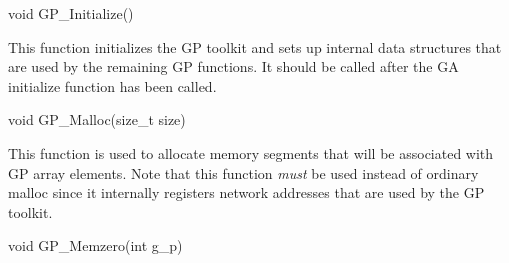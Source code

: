 \documentclass[12pt]{article}
\begin{document}


\begin{capi}
\begin{ccode}
void GP_Initialize()
\end{ccode}
\end{capi}

\wcoll

\begin{desc}

This function initializes the GP toolkit and sets up internal data structures
that are used by the remaining GP functions. It should be called after the GA
initialize function has been called.

\end{desc}



\begin{capi}
\begin{ccode}
void GP_Malloc(size_t size)
\end{ccode}
\begin{funcargs}
\end{funcargs}
\end{capi}

\local

\begin{desc}

This function is used to allocate memory segments that will be associated with
GP array elements. Note that this function \emph{must} be used instead of
ordinary malloc since it internally registers network addresses that are used by
the GP toolkit.

\end{desc}



\begin{capi}
\begin{ccode}
void GP_Memzero(int g_p)
\end{ccode}
\begin{funcargs}
\end{funcargs}
\end{capi}
\end{document}
